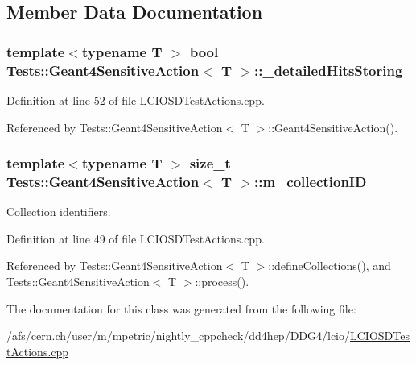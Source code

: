 \subsection{Member Data Documentation}
\hypertarget{class_tests_1_1_geant4_sensitive_action_ab3efbf4bd030df529554961e46bb0823}{
\subsubsection[{\_\-detailedHitsStoring}]{\setlength{\rightskip}{0pt plus 5cm}template$<$typename T $>$ bool {\bf Tests::Geant4SensitiveAction}$<$ {\bf T} $>$::{\bf \_\-detailedHitsStoring}}}
\label{class_tests_1_1_geant4_sensitive_action_ab3efbf4bd030df529554961e46bb0823}


Definition at line 52 of file LCIOSDTestActions.cpp.

Referenced by Tests::Geant4SensitiveAction$<$ T $>$::Geant4SensitiveAction().\hypertarget{class_tests_1_1_geant4_sensitive_action_a44a9e95251d84b3da5f5115530f9cde8}{
\subsubsection[{m\_\-collectionID}]{\setlength{\rightskip}{0pt plus 5cm}template$<$typename T $>$ size\_\-t {\bf Tests::Geant4SensitiveAction}$<$ {\bf T} $>$::{\bf m\_\-collectionID}}}
\label{class_tests_1_1_geant4_sensitive_action_a44a9e95251d84b3da5f5115530f9cde8}


Collection identifiers. 

Definition at line 49 of file LCIOSDTestActions.cpp.

Referenced by Tests::Geant4SensitiveAction$<$ T $>$::defineCollections(), and Tests::Geant4SensitiveAction$<$ T $>$::process().

The documentation for this class was generated from the following file:\begin{DoxyCompactItemize}
\item 
/afs/cern.ch/user/m/mpetric/nightly\_\-cppcheck/dd4hep/DDG4/lcio/\hyperlink{_l_c_i_o_s_d_test_actions_8cpp}{LCIOSDTestActions.cpp}\end{DoxyCompactItemize}
